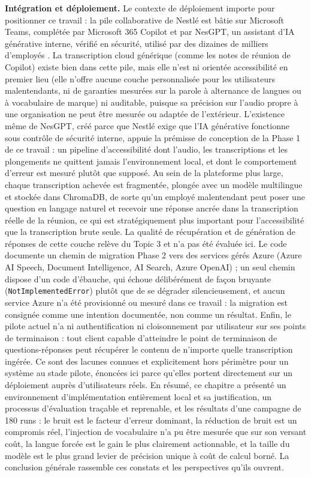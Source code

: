 \documentclass[12pt]{report}
\begin{document}
\textbf{Intégration et déploiement.} Le contexte de déploiement importe pour positionner ce travail : la pile collaborative de Nestl\'e est bâtie sur Microsoft Teams, complétée par Microsoft 365 Copilot et par NesGPT, un assistant d'IA générative interne, vérifié en sécurité, utilisé par des dizaines de milliers d'employés \cite{worklife2024nesgpt,arec2023nestle}. La transcription cloud générique (comme les notes de réunion de Copilot) existe bien dans cette pile, mais elle n'est ni orientée accessibilité en premier lieu (elle n'offre aucune couche personnalisée pour les utilisateurs malentendants, ni de garanties mesurées sur la parole à alternance de langues ou à vocabulaire de marque) ni auditable, puisque sa précision sur l'audio propre à une organisation ne peut être mesurée ou adaptée de l'extérieur. L'existence même de NesGPT, créé parce que Nestl\'e exige que l'IA générative fonctionne sous contrôle de sécurité interne, appuie la prémisse de conception de la Phase 1 de ce travail : un pipeline d'accessibilité dont l'audio, les transcriptions et les plongements ne quittent jamais l'environnement local, et dont le comportement d'erreur est mesuré plutôt que supposé. Au sein de la plateforme plus large, chaque transcription achevée est fragmentée, plongée avec un modèle multilingue et stockée dans ChromaDB, de sorte qu'un employé malentendant peut poser une question en langage naturel et recevoir une réponse ancrée dans la transcription réelle de la réunion, ce qui est stratégiquement plus important pour l'accessibilité que la transcription brute seule. La qualité de récupération et de génération de réponses de cette couche relève du Topic 3 et n'a pas été évaluée ici. Le code documente un chemin de migration Phase 2 vers des services gérés Azure (Azure AI Speech, Document Intelligence, AI Search, Azure OpenAI) ; un seul chemin dispose d'un code d'ébauche, qui échoue délibérément de façon bruyante (\texttt{NotImplementedError}) plutôt que de se dégrader silencieusement, et aucun service Azure n'a été provisionné ou mesuré dans ce travail : la migration est consignée comme une intention documentée, non comme un résultat. Enfin, le pilote actuel n'a ni authentification ni cloisonnement par utilisateur sur ses points de terminaison : tout client capable d'atteindre le point de terminaison de questions-réponses peut récupérer le contenu de n'importe quelle transcription ingérée. Ce sont des lacunes connues et explicitement hors périmètre pour un système au stade pilote, énoncées ici parce qu'elles portent directement sur un déploiement auprès d'utilisateurs réels.
\vspace{0.5em}
En résumé, ce chapitre a présenté un environnement d'implémentation entièrement local et sa justification, un processus d'évaluation traçable et reprenable, et les résultats d'une campagne de 180 runs : le bruit est le facteur d'erreur dominant, la réduction de bruit est un compromis réel, l'injection de vocabulaire n'a pu être mesurée que sur son versant coût, la langue forcée est le gain le plus clairement actionnable, et la taille du modèle est le plus grand levier de précision unique à coût de calcul borné. La conclusion générale rassemble ces constats et les perspectives qu'ils ouvrent.
\end{document}
